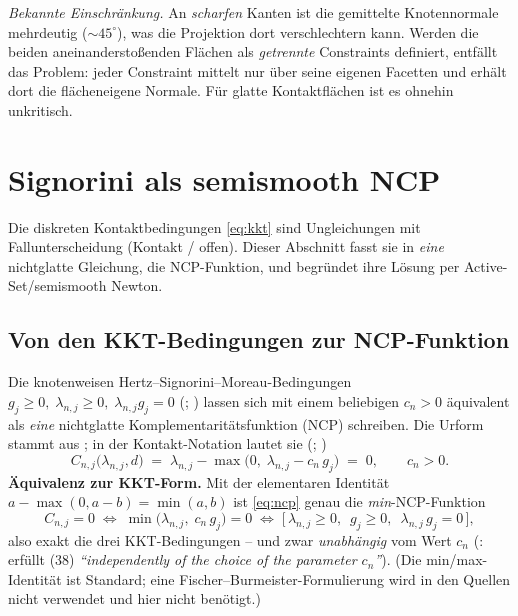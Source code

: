 \documentclass[a4paper,11pt]{article}
\def\bm#1{#1}%
\def\tilde#1{#1}%
\let\stdsection\section
\renewcommand{\section}{\clearpage\stdsection}
\begin{document}
\medskip
\noindent\textit{Bekannte Einschränkung.} An \emph{scharfen} Kanten ist die gemittelte
Knotennormale mehrdeutig ($\sim45^\circ$), was die Projektion dort verschlechtern kann. Werden die
beiden aneinanderstoßenden Flächen als \emph{getrennte} Constraints definiert, entfällt das
Problem: jeder Constraint mittelt nur über seine eigenen Facetten und erhält dort die
flächeneigene Normale. Für glatte Kontaktflächen ist es ohnehin unkritisch.

\section{Signorini als semismooth NCP}
\label{sec:ncp}

Die diskreten Kontaktbedingungen \eqref{eq:kkt} sind Ungleichungen mit Fallunterscheidung
(Kontakt / offen). Dieser Abschnitt fasst sie in \emph{eine} nichtglatte Gleichung, die
NCP-Funktion, und begründet ihre Lösung per Active-Set/semismooth Newton.

\subsection{Von den KKT-Bedingungen zur NCP-Funktion}
Die knotenweisen Hertz--Signorini--Moreau-Bedingungen
$\tilde g_{j}\ge0,\; \lambda_{n,j}\ge0,\; \lambda_{n,j}\tilde g_{j}=0$
(\citealp[Gl.~(3.41)]{farah}; \citealp[Gl.~(38)]{gitterle}) lassen sich mit einem beliebigen
$c_n>0$ äquivalent als \emph{eine} nichtglatte Komplementaritätsfunktion (NCP) schreiben. Die Urform
stammt aus \citet[Gl.~(3.9)]{hueber2005}; in der Kontakt-Notation lautet sie
(\citealp[Gl.~(55)]{gitterle}; \citealp[Gl.~(3.58)]{farah})
\begin{equation}
C_{n,j}\big(\lambda_{n,j},\bm d\big) \;=\; \lambda_{n,j} - \max\!\big(0,\; \lambda_{n,j} - c_n\,\tilde g_{j}\big) \;=\; 0,
\qquad c_n>0 .
\label{eq:ncp}
\end{equation}
\textbf{Äquivalenz zur KKT-Form.} Mit der elementaren Identität
$a - \max(0, a-b) = \min(a,b)$ ist \eqref{eq:ncp} genau die \emph{min}-NCP-Funktion
\begin{equation}
C_{n,j}=0 \;\Longleftrightarrow\; \min\!\big(\lambda_{n,j},\; c_n\,\tilde g_{j}\big)=0
\;\Longleftrightarrow\; \big[\,\lambda_{n,j}\ge0,\;\ \tilde g_{j}\ge0,\;\ \lambda_{n,j}\,\tilde g_{j}=0\,\big],
\end{equation}
also exakt die drei KKT-Bedingungen -- und zwar \emph{unabhängig} vom Wert $c_n$
(\citealp[Gl.~(56)]{gitterle}: erfüllt (38) \emph{``independently of the choice of the parameter $c_n$''}). (Die
min/max-Identität ist Standard; eine Fischer--Burmeister-Formulierung wird in den Quellen nicht
verwendet und hier nicht benötigt.)
\end{document}

